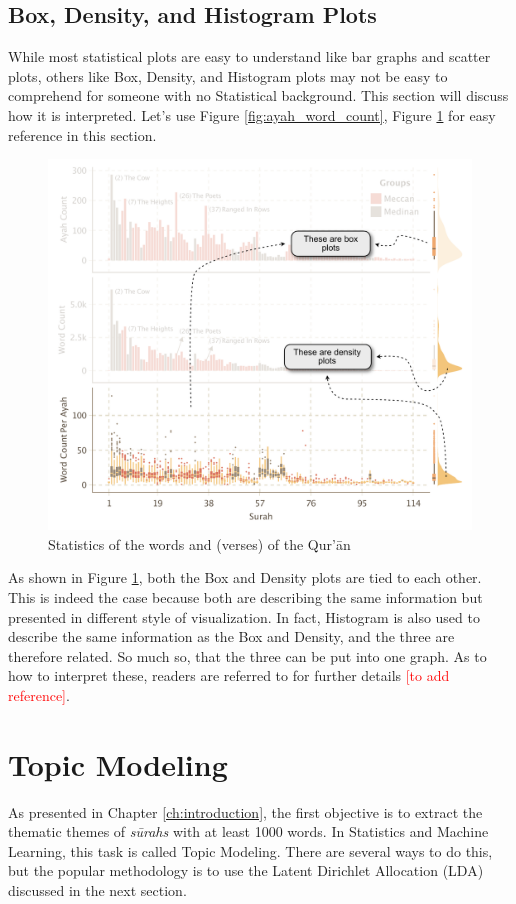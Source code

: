 \subsection{Box, Density, and Histogram Plots}
While most statistical plots are easy to understand like bar graphs and scatter plots, others like Box, Density, and Histogram plots may not be easy to comprehend for someone with no Statistical background. This section will discuss how it is interpreted. Let's use Figure \ref{fig:ayah_word_count}, Figure \ref{fig:ayah_word_count_with_desc} for easy reference in this section.
\begin{figure}[!b]
    \centering
    \includegraphics[width=\textwidth]{img/plot1-desc.pdf}
    \caption{Statistics of the words and   (verses) of the Qur'\=an}
    \label{fig:ayah_word_count_with_desc}
\end{figure}

As shown in Figure \ref{fig:ayah_word_count_with_desc}, both the Box and Density plots are tied to each other. This is indeed the case because both are describing the same information but presented in different style of visualization. In fact, Histogram is also used to describe the same information as the Box and Density, and the three are therefore related. So much so, that the three can be put into one graph. As to how to interpret these, readers are referred to for further details \textcolor{red}{[to add reference]}.
\section{Topic Modeling}\label{sec:topic_modeling_method}
As presented in Chapter \ref{ch:introduction}, the first objective is to extract the thematic themes of \textit{s\=urahs}  with at least 1000 words. In Statistics and Machine Learning, this task is called Topic Modeling. There are several ways to do this, but the popular methodology is to use the Latent Dirichlet Allocation (LDA) discussed in the next section.
